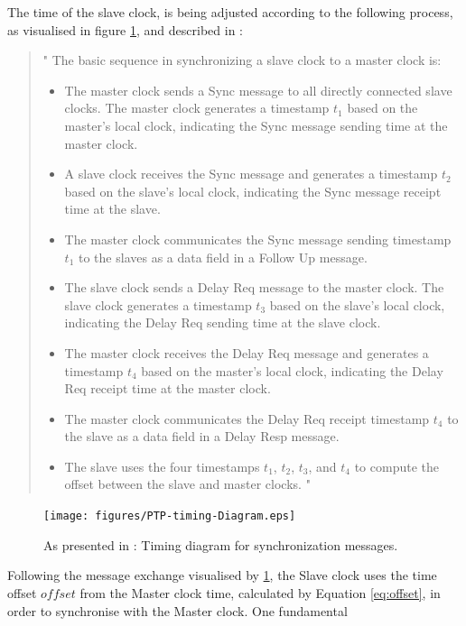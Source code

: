 The time of the slave clock, is being adjusted according to the following process, as visualised in figure \ref{fig:PTP-timing-Diagram}, and described in \cite[p. 51]{Eidson2006}:


\begin{quotation}
    
   " The basic sequence in synchronizing a slave clock to a master clock is:
    \begin{itemize}
        \item The master clock sends a Sync message to all directly connected slave
clocks. The master clock generates a timestamp $t_1$ based on the master’s
local clock, indicating the Sync message sending time at the master clock.
\item A slave clock receives the Sync message and generates a timestamp $t_2$
based on the slave’s local clock, indicating the Sync message receipt time
at the slave.
\item The master clock communicates the Sync message sending timestamp $t_1$
to the slaves as a data field in a Follow Up message.
\item The slave clock sends a Delay Req message to the master clock. The slave
clock generates a timestamp $t_3$ based on the slave’s local clock, indicating
the Delay Req sending time at the slave clock.
\item The master clock receives the Delay Req message and generates a timestamp $t_4$ based on the master’s local clock, indicating the Delay Req receipt time at the master clock.
\item The master clock communicates the Delay Req receipt timestamp $t_4$ to
the slave as a data field in a Delay Resp message.
\item The slave uses the four timestamps $t_1$, $t_2$, $t_3$, and $t_4$ to compute the offset
between the slave and master clocks. "\cite[p. 51]{Eidson2006}
    
    \end{itemize} 
\end{quotation}


\begin{figure}[ht]
    \centering 
    \texttt{[image: figures/PTP-timing-Diagram.eps]}
    \caption[Timing diagram for synchronization messages]{As presented in \cite[p. 51]{Eidson2006}: Timing diagram for synchronization messages.} 
    \label{fig:PTP-timing-Diagram} 
\end{figure}  


Following the message exchange visualised by \figureautorefname { } \ref{fig:PTP-timing-Diagram}, the Slave clock  uses the time offset $offset$ from the Master clock time, calculated by Equation \ref{eq:offset}, in order to synchronise with the Master clock. One fundamental 


